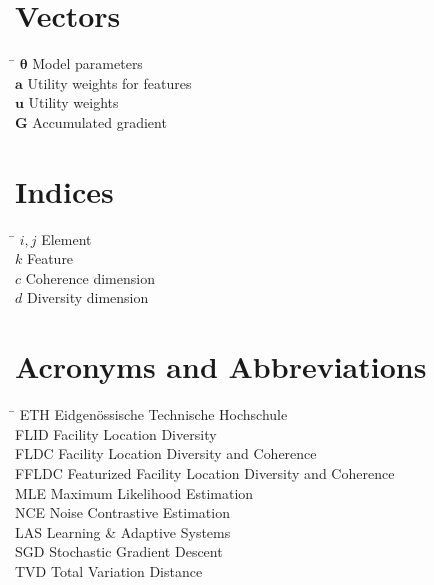 \section*{Vectors}

\begin{tabbing}
  \hspace*{1.6cm} \= \kill
  $\boldsymbol{\theta}$ \> Model parameters \\ [0.5ex]
  $\mathbf{a}$ \> Utility weights for features \\ [0.5ex]
  $\mathbf{u}$ \> Utility weights \\ [0.5ex]
  $\mathbf{G}$ \> Accumulated gradient \\ [0.5ex]
\end{tabbing}

\section*{Indices}

\begin{tabbing}
  \hspace*{1.6cm} \= \kill
  $i, j$ \> Element \\ [0.5ex]
  $k$ \> Feature \\ [0.5ex]
  $c$ \> Coherence dimension \\ [0.5ex]
  $d$ \> Diversity dimension \\ [0.5ex]
\end{tabbing}

\section*{Acronyms and Abbreviations}
\begin{tabbing}
 \hspace*{1.6cm}  \= \kill
 ETH \> Eidgenössische Technische Hochschule \\[0.5ex]
 FLID \> Facility Location Diversity \\[0.5ex]
 FLDC \> Facility Location Diversity and Coherence \\[0.5ex]
 FFLDC \> Featurized Facility Location Diversity and Coherence \\ [0.5ex]
 MLE \> Maximum Likelihood Estimation \\ [0.5ex]
 NCE \> Noise Contrastive Estimation \\ [0.5ex]
 LAS \> Learning \& Adaptive Systems \\ [0.5ex]
 SGD \> Stochastic Gradient Descent \\ [0.5ex]
 TVD \> Total Variation Distance \\ [0.5ex]
\end{tabbing}